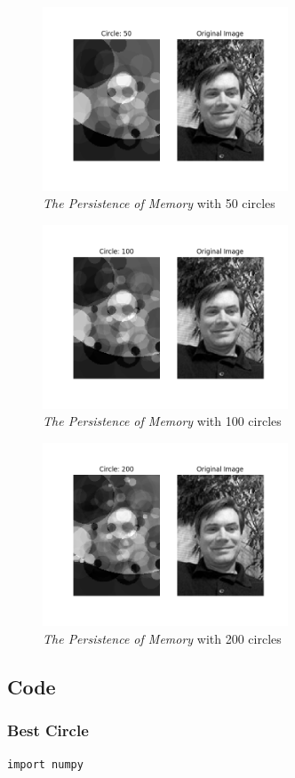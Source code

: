 \documentclass[12pt]{article}
\begin{document}
\begin{figure}[H]
\centering
\noindent\includegraphics[width=0.65\textwidth]{../results/jmcgough/jmcgough_0050.png}
\caption{\textit{The Persistence of Memory} with 50 circles}
\label{fig:jmcgough_0050}
\end{figure}

\begin{figure}[H]
\centering
\noindent\includegraphics[width=0.65\textwidth]{../results/jmcgough/jmcgough_0100.png}
\caption{\textit{The Persistence of Memory} with 100 circles}
\label{fig:jmcgough_0100}
\end{figure}

\begin{figure}[H]
\centering
\noindent\includegraphics[width=0.65\textwidth]{../results/jmcgough/jmcgough_0200.png}
\caption{\textit{The Persistence of Memory} with 200 circles}
\label{fig:jmcgough_0200}
\end{figure}



\newpage
\subsection{Code}
\subsubsection{Best Circle}
\begin{lstlisting}
import numpy
\end{lstlisting}
\end{document}
